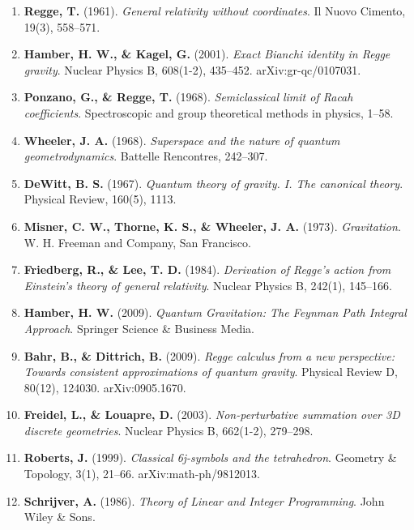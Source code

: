 \documentclass[11pt]{article}
\begin{document}
\begin{enumerate}[leftmargin=1.4em,itemsep=0.2em]
\item \textbf{Regge, T.} (1961). \emph{General relativity without coordinates}. Il Nuovo Cimento, 19(3), 558--571.
\item \textbf{Hamber, H. W., \& Kagel, G.} (2001). \emph{Exact Bianchi identity in Regge gravity}. Nuclear Physics B, 608(1-2), 435--452. arXiv:gr-qc/0107031.
\item \textbf{Ponzano, G., \& Regge, T.} (1968). \emph{Semiclassical limit of Racah coefficients}. Spectroscopic and group theoretical methods in physics, 1--58.
\item \textbf{Wheeler, J. A.} (1968). \emph{Superspace and the nature of quantum geometrodynamics}. Battelle Rencontres, 242--307.
\item \textbf{DeWitt, B. S.} (1967). \emph{Quantum theory of gravity. I. The canonical theory}. Physical Review, 160(5), 1113.
\item \textbf{Misner, C. W., Thorne, K. S., \& Wheeler, J. A.} (1973). \emph{Gravitation}. W. H. Freeman and Company, San Francisco.
\item \textbf{Friedberg, R., \& Lee, T. D.} (1984). \emph{Derivation of Regge's action from Einstein's theory of general relativity}. Nuclear Physics B, 242(1), 145--166.
\item \textbf{Hamber, H. W.} (2009). \emph{Quantum Gravitation: The Feynman Path Integral Approach}. Springer Science \& Business Media.
\item \textbf{Bahr, B., \& Dittrich, B.} (2009). \emph{Regge calculus from a new perspective: Towards consistent approximations of quantum gravity}. Physical Review D, 80(12), 124030. arXiv:0905.1670.
\item \textbf{Freidel, L., \& Louapre, D.} (2003). \emph{Non-perturbative summation over 3D discrete geometries}. Nuclear Physics B, 662(1-2), 279--298.
\item \textbf{Roberts, J.} (1999). \emph{Classical 6j-symbols and the tetrahedron}. Geometry \& Topology, 3(1), 21--66. arXiv:math-ph/9812013.
\item \textbf{Schrijver, A.} (1986). \emph{Theory of Linear and Integer Programming}. John Wiley \& Sons.
\end{enumerate}
\end{document}
